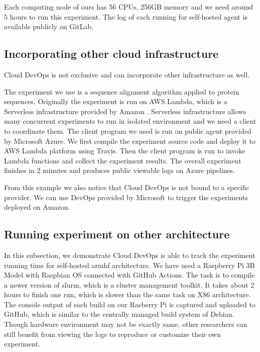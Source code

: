 \documentclass[10pt, conference, compsocconf]{IEEEtran}
\begin{document}
Each computing node of ours has 56 CPUs, 256GB memory and we need around 5 hours to run this experiment. The log of each running for self-hosted agent is available publicly on GitLab.

\subsection{Incorporating other cloud infrastructure}
Cloud DevOps is not exclusive and can incorporate other infrastructure as well.

The experiment we use is a sequence alignment algorithm applied to protein sequences. 
Originally the experiment is run on AWS Lambda, which is a Serverless infrastructure provided by Amazon \cite{niu2019leveraging}. Serverless infrastructure allows many concurrent experiments to run in isolated environment and
we need a client to coordinate them. The client program we used is run on public agent provided by Microsoft Azure. We first compile the experiment source code and deploy it to AWS Lambda platform using Travis. Then the client program is run to invoke Lambda functions and collect the experiment results.
The overall experiment finishes in 2 minutes and produces public viewable logs on Azure pipelines. 

From this example we also notice that Cloud DevOps is not bound to a specific provider. We can use DevOps provided by Microsoft to trigger the experiments deployed on Amazon.

\subsection{Running experiment on other architecture}
In this subsection, we demonstrate Cloud DevOps is able to track the experiment running time for
self-hosted armhf architecture. We have used a Raspberry Pi  3B Model with Raspbian OS connected
with GitHub Actions. The task is to compile a newer version of slurm, which is a cluster management
toolkit. It takes about 2 hours to finish one run, which is slower than the same task on X86 architecture. The console output of each build on our Rasberry Pi is captured and uploaded to GitHub, which is similar to the centrally managed build system of Debian. Though hardware environment may not be exactly same, other researchers can still benefit from viewing the logs to reproduce or customize their own experiment.
\end{document}
